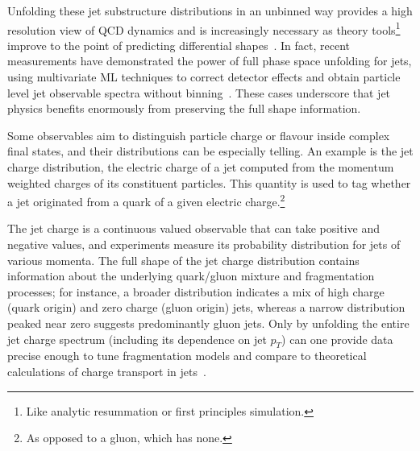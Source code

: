 \begin{description}
            Unfolding these jet substructure distributions in an unbinned way provides a high resolution view of QCD dynamics and is increasingly necessary as theory tools\footnote{Like analytic resummation or first principles simulation.} improve to the point of predicting differential shapes~\cite{Canelli:2025ybb, H1:2021wkz, Shmakov:2024gkd}.
            In fact, recent measurements have demonstrated the power of full phase space unfolding for jets, using multivariate ML techniques to correct detector effects and obtain particle level jet observable spectra without binning~\cite{Arratia:2021otl, Milton:2025mug,collaboration_machine_2024, collaboration_machine_2025, Aguilar-Saavedra:2014kpa}.
            These cases underscore that jet physics benefits enormously from preserving the full shape information.
        \item[Charge and flavour sensitive observables:]
            Some observables aim to distinguish particle charge or flavour inside complex final states, and their distributions can be especially telling.
            An example is the jet charge distribution, the electric charge of a jet computed from the momentum weighted charges of its constituent particles.
            This quantity is used to tag whether a jet originated from a quark of a given electric charge.\footnote{As opposed to a gluon, which has none.}
            
            The jet charge is a continuous valued observable that can take positive and negative values, and experiments measure its probability distribution for jets of various momenta.
            The full shape of the jet charge distribution contains information about the underlying quark/gluon mixture and fragmentation processes;
            for instance, a broader distribution indicates a mix of high charge (quark origin) and zero charge (gluon origin) jets, whereas a narrow distribution peaked near zero suggests predominantly gluon jets.
            Only by unfolding the entire jet charge spectrum (including its dependence on jet $p_T$) can one provide data precise enough to tune fragmentation models and compare to theoretical calculations of charge transport in jets~\cite{CMS:2017yer,CMS:2020plq,Larkoski:2024uoc,Accardi:2022oog,Baldenegro:2024pfb,AbdulKhalek:2021gbh, Larkoski2020JetLearning}.
            

\end{description}
